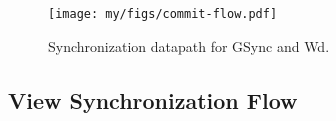 








\begin{figure}[t]
  \texttt{[image: my/figs/commit-flow.pdf]}
  \caption{Synchronization datapath for GSync and Wd.}
  \label{fig:cmt}
\end{figure}


\subsection{View Synchronization Flow}  \label{subsec:vsf}



